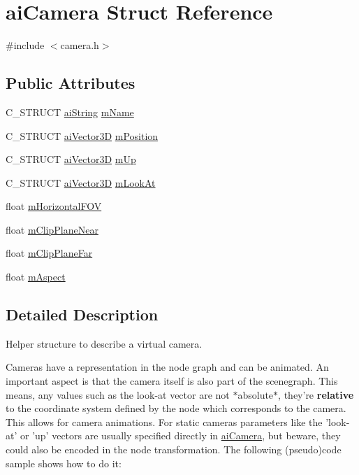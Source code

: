 \hypertarget{structaiCamera}{\section{ai\-Camera \-Struct \-Reference}
\label{structaiCamera}
}


{\ttfamily \#include $<$camera.\-h$>$}

\subsection*{\-Public \-Attributes}
\begin{DoxyCompactItemize}
\item 
\-C\-\_\-\-S\-T\-R\-U\-C\-T \hyperlink{structaiString}{ai\-String} \hyperlink{structaiCamera_aa6a5fe5e04b3db1b23f69eb9910c6816}{m\-Name}
\item 
\-C\-\_\-\-S\-T\-R\-U\-C\-T \hyperlink{structaiVector3D}{ai\-Vector3\-D} \hyperlink{structaiCamera_a518617ea192ca0698e748a4399e7c3a5}{m\-Position}
\item 
\-C\-\_\-\-S\-T\-R\-U\-C\-T \hyperlink{structaiVector3D}{ai\-Vector3\-D} \hyperlink{structaiCamera_a7fb42b287389b4f99c883098268d6d1a}{m\-Up}
\item 
\-C\-\_\-\-S\-T\-R\-U\-C\-T \hyperlink{structaiVector3D}{ai\-Vector3\-D} \hyperlink{structaiCamera_af9463249ac870e030fa435b1186cef23}{m\-Look\-At}
\item 
float \hyperlink{structaiCamera_adcdea73ece19ea0a9068f5544ec23592}{m\-Horizontal\-F\-O\-V}
\item 
float \hyperlink{structaiCamera_a720e8c94c036dcefe4b13cc1c69c521e}{m\-Clip\-Plane\-Near}
\item 
float \hyperlink{structaiCamera_aa9ccf77e3d7ca3dc8f46df931b65172f}{m\-Clip\-Plane\-Far}
\item 
float \hyperlink{structaiCamera_ae414556eaa6f910b5927f465d97bf70c}{m\-Aspect}
\end{DoxyCompactItemize}


\subsection{\-Detailed \-Description}
\-Helper structure to describe a virtual camera.

\-Cameras have a representation in the node graph and can be animated. \-An important aspect is that the camera itself is also part of the scenegraph. \-This means, any values such as the look-\/at vector are not $\ast$absolute$\ast$, they're {\bfseries relative} to the coordinate system defined by the node which corresponds to the camera. \-This allows for camera animations. \-For static cameras parameters like the 'look-\/at' or 'up' vectors are usually specified directly in \hyperlink{structaiCamera}{ai\-Camera}, but beware, they could also be encoded in the node transformation. \-The following (pseudo)code sample shows how to do it\-: \par
\par
 
